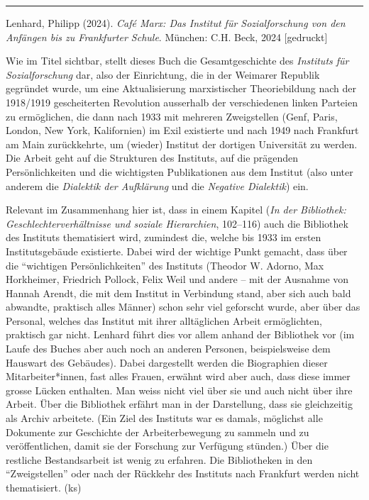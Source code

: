 \documentclass[a4paper,
fontsize=11pt,
oneside,
numbers=noperiodatend,
parskip=half-,
bibliography=totoc,
final
]{scrartcl}
\begin{document}
\begin{center}\rule{0.5\linewidth}{0.5pt}\end{center}

Lenhard, Philipp (2024). \emph{Café Marx: Das Institut für
Sozialforschung von den Anfängen bis zu Frankfurter Schule}. München:
C.H. Beck, 2024 {[}gedruckt{]}

Wie im Titel sichtbar, stellt dieses Buch die Gesamtgeschichte des
\emph{Instituts für Sozialforschung} dar, also der Einrichtung, die in
der Weimarer Republik gegründet wurde, um eine Aktualisierung
marxistischer Theoriebildung nach der 1918/1919 gescheiterten Revolution
ausserhalb der verschiedenen linken Parteien zu ermöglichen, die dann
nach 1933 mit mehreren Zweigstellen (Genf, Paris, London, New York,
Kalifornien) im Exil existierte und nach 1949 nach Frankfurt am Main
zurückkehrte, um (wieder) Institut der dortigen Universität zu werden.
Die Arbeit geht auf die Strukturen des Instituts, auf die prägenden
Persönlichkeiten und die wichtigsten Publikationen aus dem Institut
(also unter anderem die \emph{Dialektik der Aufklärung} und die
\emph{Negative Dialektik}) ein.

Relevant im Zusammenhang hier ist, dass in einem Kapitel (\emph{In der
Bibliothek: Geschlechterverhältnisse und soziale Hierarchien}, 102--116)
auch die Bibliothek des Instituts thematisiert wird, zumindest die,
welche bis 1933 im ersten Institutsgebäude existierte. Dabei wird der
wichtige Punkt gemacht, dass über die ``wichtigen Persönlichkeiten'' des
Instituts (Theodor W. Adorno, Max Horkheimer, Friedrich Pollock, Felix
Weil und andere -- mit der Ausnahme von Hannah Arendt, die mit dem
Institut in Verbindung stand, aber sich auch bald abwandte, praktisch
alles Männer) schon sehr viel geforscht wurde, aber über das Personal,
welches das Institut mit ihrer alltäglichen Arbeit ermöglichten,
praktisch gar nicht. Lenhard führt dies vor allem anhand der Bibliothek
vor (im Laufe des Buches aber auch noch an anderen Personen,
beispielsweise dem Hauswart des Gebäudes). Dabei dargestellt werden die
Biographien dieser Mitarbeiter*innen, fast alles Frauen, erwähnt wird
aber auch, dass diese immer grosse Lücken enthalten. Man weiss nicht
viel über sie und auch nicht über ihre Arbeit. Über die Bibliothek
erfährt man in der Darstellung, dass sie gleichzeitig als Archiv
arbeitete. (Ein Ziel des Instituts war es damals, möglichst alle
Dokumente zur Geschichte der Arbeiterbewegung zu sammeln und zu
veröffentlichen, damit sie der Forschung zur Verfügung stünden.) Über
die restliche Bestandsarbeit ist wenig zu erfahren. Die Bibliotheken in
den ``Zweigstellen'' oder nach der Rückkehr des Instituts nach Frankfurt
werden nicht thematisiert. (ks)
\end{document}
